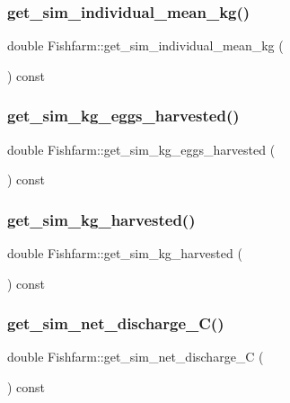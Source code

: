 \subsubsection{\texorpdfstring{get\_sim\_individual\_mean\_kg()}{get\_sim\_individual\_mean\_kg()}}
{\footnotesize\ttfamily double Fishfarm\+::get\+\_\+sim\+\_\+individual\+\_\+mean\+\_\+kg (\begin{DoxyParamCaption}{ }\end{DoxyParamCaption}) const}

\mbox{\label{class_fishfarm_a0bd9d174a35d21c9624a20bd273e318f}} 
\subsubsection{\texorpdfstring{get\_sim\_kg\_eggs\_harvested()}{get\_sim\_kg\_eggs\_harvested()}}
{\footnotesize\ttfamily double Fishfarm\+::get\+\_\+sim\+\_\+kg\+\_\+eggs\+\_\+harvested (\begin{DoxyParamCaption}{ }\end{DoxyParamCaption}) const}

\mbox{\label{class_fishfarm_a214d56e185267a336864f02c1c9629da}} 
\subsubsection{\texorpdfstring{get\_sim\_kg\_harvested()}{get\_sim\_kg\_harvested()}}
{\footnotesize\ttfamily double Fishfarm\+::get\+\_\+sim\+\_\+kg\+\_\+harvested (\begin{DoxyParamCaption}{ }\end{DoxyParamCaption}) const}

\mbox{\label{class_fishfarm_a29bf78bd1864f4d6c476d6bcd26466b7}} 
\subsubsection{\texorpdfstring{get\_sim\_net\_discharge\_C()}{get\_sim\_net\_discharge\_C()}}
{\footnotesize\ttfamily double Fishfarm\+::get\+\_\+sim\+\_\+net\+\_\+discharge\+\_\+C (\begin{DoxyParamCaption}{ }\end{DoxyParamCaption}) const}

